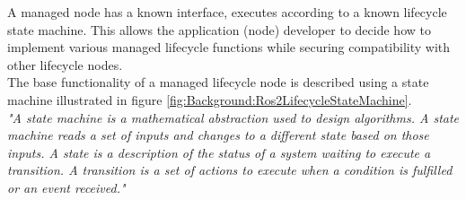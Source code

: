 	A managed node has a known interface, executes according to a known lifecycle state machine. This allows the application (node) developer to decide how to implement various managed lifecycle functions while securing compatibility with other lifecycle nodes.\\
	
	The base functionality of a managed lifecycle node is described using a state machine illustrated in figure \ref*{fig:Background:Ros2LifecycleStateMachine}.\\

	\textit{"A state machine is a mathematical abstraction used to design algorithms. A state machine reads a set of inputs and changes to a different state based on those inputs. A state is a description of the status of a system waiting to execute a transition. A transition is a set of actions to execute when a condition is fulfilled or an event received."} \cite*{statemachineDef}\\


